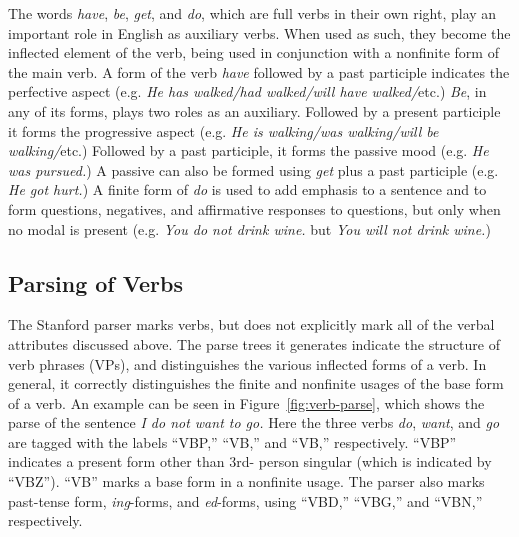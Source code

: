 \documentclass[main.tex]{subfiles}
\begin{document}
The words \textit{have}, \textit{be}, \textit{get}, and \textit{do}, which are full verbs in their own right, play an important role in English as auxiliary verbs. When used as such, they become the inflected element of the verb, being used in conjunction with a nonfinite form of the main verb. A form of the verb \textit{have} followed by a past participle indicates the perfective aspect (e.g. \textit{He has walked/had walked/will have walked/}etc.) \textit{Be}, in any of its forms, plays two roles as an auxiliary. Followed by a present participle it forms the progressive aspect (e.g. \textit{He is walking/was walking/will be walking/}etc.) Followed by a past participle, it forms the passive mood (e.g. \textit{He was pursued.}) A passive can also be formed using \textit{get} plus a past participle (e.g. \textit{He got hurt.}) A finite form of \textit{do} is used to add emphasis to a sentence and to form questions, negatives, and affirmative responses to questions, but only when no modal is present (e.g. \textit{You do not drink wine.} but \textit{You will not drink wine.})

\subsection{Parsing of Verbs}

The Stanford parser marks verbs, but does not explicitly mark all of the verbal attributes discussed above. The parse trees it generates indicate the structure of verb phrases (VPs), and distinguishes the various inflected forms of a verb. In general, it correctly distinguishes the finite and nonfinite usages of the base form of a verb. An example can be seen in Figure~\ref{fig:verb-parse}, which shows the parse of the sentence \textit{I do not want to go.} Here the three verbs \textit{do}, \textit{want}, and \textit{go} are tagged with the labels ``VBP,'' ``VB,'' and ``VB,'' respectively. ``VBP'' indicates a present form other than 3rd- person singular (which is indicated by ``VBZ''). ``VB'' marks a base form in a nonfinite usage. The parser also marks past-tense form, \textit{ing}-forms, and \textit{ed}-forms, using ``VBD,'' ``VBG,'' and ``VBN,'' respectively. 
\end{document}

